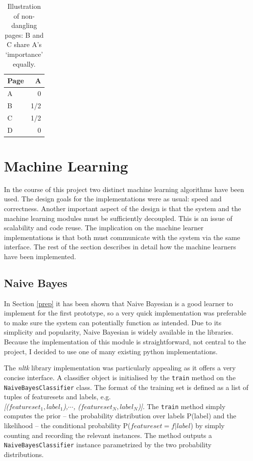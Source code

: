 \documentclass[12pt,twoside,notitlepage]{report}
\begin{document}
\begin{table}
    \begin{center}
      \begin{tabular}{|l|r|}
        \hline
        Page & A \\ \hline
         A &  0  \\ \hline
         B & 1/2 \\ \hline
         C & 1/2 \\ \hline
         D & 0   \\ \hline
      \end{tabular}
      \caption{Illustration of non-dangling pages: B and C share A's `importance' equally.\label{tab}}
  \end{center}
\end{table}

\section{Machine Learning}
In the course of this project two distinct machine learning algorithms have
been used. The design goals for the implementations were as usual: speed and
correctness. Another important aspect of the design is that the system and the
machine learning modules must be sufficiently decoupled. This is an issue of
scalability and code reuse. The implication on the machine learner
implementations is that both must communicate with the system via the same
interface.
The rest of the section describes in detail how the machine learners have been
implemented.

\subsection{Naive Bayes}
In Section \ref{prep} it has been shown that Naive Bayesian is a good learner
to implement for the first prototype, so a very quick implementation was
preferable to make sure the system can potentially function as intended. Due to
its simplicity and popularity, Naive Bayesian is widely available in the
libraries. Because the implementation of this module is straightforward, not
central to the project, I decided to use one of many existing python
implementations. 

The \textit{nltk} library implementation was particularly appealing as it offers a very
concise interface. A classifier object is initialised by the \texttt{train}
method on the \texttt{NaiveBayesClassifier} class. The format of the training
set is defined as a list of tuples of featuresets and labels, e.g.
\\ \textit{[(\(featureset_1, label_1\)),\( \cdots\), (\(featureset_N,
label_N\))]}. 
The \texttt{train} method simply computes the prior -- the probability distribution over
labels P(label) and the likelihood -- the conditional probability
P(\(featureset=f|label\)) by simply counting and recording the relevant instances. The method
outputs a \texttt{NaiveBayesClassifier} instance parametrized by the two
probability distributions.
\end{document}
